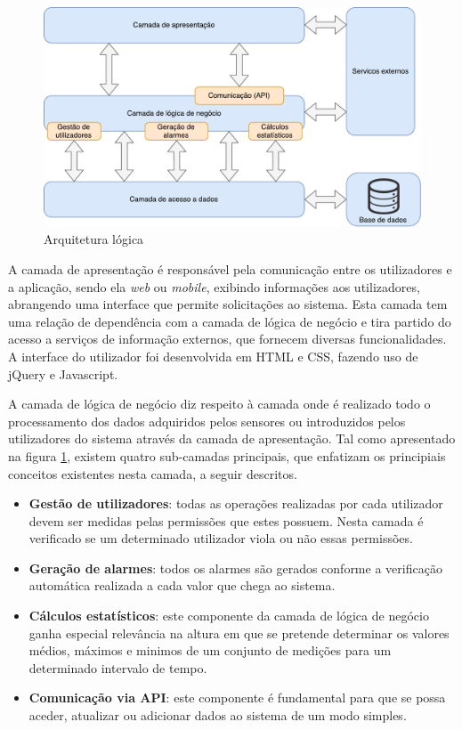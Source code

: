 \begin{figure}[!htb]
	\centering
	\includegraphics[scale = 0.6]{esquemas/arquitetura-logica.pdf}
	\caption{Arquitetura lógica}
	\label{logicaarqu}
\end{figure}



A camada de apresentação é responsável pela comunicação entre os utilizadores e a aplicação, sendo ela \textit{web} ou \textit{mobile}, exibindo informações aos utilizadores, abrangendo uma interface que permite solicitações ao sistema. Esta camada tem uma relação de dependência com a camada de lógica de negócio e tira partido do acesso a serviços de informação externos, que fornecem diversas funcionalidades. A interface do utilizador foi desenvolvida em  \ac{HTML} e \acs{CSS}, fazendo uso de jQuery e Javascript.





A camada de lógica de negócio diz respeito à camada onde é realizado todo o processamento dos dados adquiridos pelos sensores ou introduzidos pelos utilizadores do sistema através da camada de apresentação.  Tal como apresentado na figura \ref{logicaarqu}, existem quatro sub-camadas principais, que enfatizam os principiais conceitos existentes nesta camada, a seguir descritos.  


\begin{itemize}
	\item \textbf{Gestão de utilizadores}: todas as operações realizadas por cada utilizador devem ser medidas pelas permissões que estes possuem. Nesta camada é verificado se um determinado utilizador viola ou não essas permissões. 
	
	\item \textbf{Geração de alarmes}: todos os alarmes são gerados conforme a verificação automática realizada a cada valor que chega ao sistema. 
	\item \textbf{Cálculos estatísticos}: este componente da camada de lógica de negócio ganha especial relevância na altura em que se pretende determinar os valores médios, máximos e minimos de um conjunto de medições para um determinado intervalo de tempo. 
	\item \textbf{Comunicação via \ac{API}}: este componente é fundamental para que se possa aceder, atualizar ou adicionar dados ao sistema de um modo simples.
\end{itemize}



